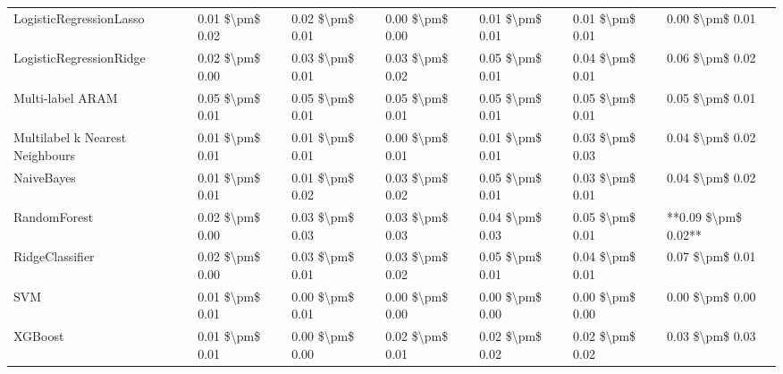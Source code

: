 \begin{tabular}{lllllll}
LogisticRegressionLasso         &  0.01 \$\textbackslash pm\$ 0.02 &           0.02 \$\textbackslash pm\$ 0.01 &       0.00 \$\textbackslash pm\$ 0.00 &        0.01 \$\textbackslash pm\$ 0.01 &                         0.01 \$\textbackslash pm\$ 0.01 &      0.00 \$\textbackslash pm\$ 0.01 \\
LogisticRegressionRidge         &  0.02 \$\textbackslash pm\$ 0.00 &           0.03 \$\textbackslash pm\$ 0.01 &       0.03 \$\textbackslash pm\$ 0.02 &        0.05 \$\textbackslash pm\$ 0.01 &                         0.04 \$\textbackslash pm\$ 0.01 &      0.06 \$\textbackslash pm\$ 0.02 \\
Multi-label ARAM                &  0.05 \$\textbackslash pm\$ 0.01 &           0.05 \$\textbackslash pm\$ 0.01 &       0.05 \$\textbackslash pm\$ 0.01 &        0.05 \$\textbackslash pm\$ 0.01 &                         0.05 \$\textbackslash pm\$ 0.01 &      0.05 \$\textbackslash pm\$ 0.01 \\
Multilabel k Nearest Neighbours &  0.01 \$\textbackslash pm\$ 0.01 &           0.01 \$\textbackslash pm\$ 0.01 &       0.00 \$\textbackslash pm\$ 0.01 &        0.01 \$\textbackslash pm\$ 0.01 &                         0.03 \$\textbackslash pm\$ 0.03 &      0.04 \$\textbackslash pm\$ 0.02 \\
NaiveBayes                      &  0.01 \$\textbackslash pm\$ 0.01 &           0.01 \$\textbackslash pm\$ 0.02 &       0.03 \$\textbackslash pm\$ 0.02 &        0.05 \$\textbackslash pm\$ 0.01 &                         0.03 \$\textbackslash pm\$ 0.01 &      0.04 \$\textbackslash pm\$ 0.02 \\
RandomForest                    &  0.02 \$\textbackslash pm\$ 0.00 &           0.03 \$\textbackslash pm\$ 0.03 &       0.03 \$\textbackslash pm\$ 0.03 &        0.04 \$\textbackslash pm\$ 0.03 &                         0.05 \$\textbackslash pm\$ 0.01 &  **0.09 \$\textbackslash pm\$ 0.02** \\
RidgeClassifier                 &  0.02 \$\textbackslash pm\$ 0.00 &           0.03 \$\textbackslash pm\$ 0.01 &       0.03 \$\textbackslash pm\$ 0.02 &        0.05 \$\textbackslash pm\$ 0.01 &                         0.04 \$\textbackslash pm\$ 0.01 &      0.07 \$\textbackslash pm\$ 0.01 \\
SVM                             &  0.01 \$\textbackslash pm\$ 0.01 &           0.00 \$\textbackslash pm\$ 0.01 &       0.00 \$\textbackslash pm\$ 0.00 &        0.00 \$\textbackslash pm\$ 0.00 &                         0.00 \$\textbackslash pm\$ 0.00 &      0.00 \$\textbackslash pm\$ 0.00 \\
XGBoost                         &  0.01 \$\textbackslash pm\$ 0.01 &           0.00 \$\textbackslash pm\$ 0.00 &       0.02 \$\textbackslash pm\$ 0.01 &        0.02 \$\textbackslash pm\$ 0.02 &                         0.02 \$\textbackslash pm\$ 0.02 &      0.03 \$\textbackslash pm\$ 0.03 \\
\bottomrule
\end{tabular}
